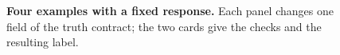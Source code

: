 \documentclass{clv2025}
\begin{document}
\begin{figure}[t]
\centering

\caption{\textbf{Four examples with a fixed response.} Each panel changes one field of the truth contract; the two cards give the checks and the resulting label.}
\end{figure}
\end{document}
